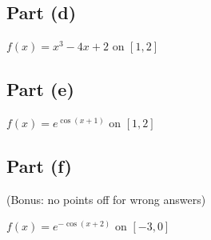 \subsection{Part (d)}

\begin{question}
\begin{center}
    $f(x) = x^3 −4x + 2$ on $[1,2]$
\end{center}
\end{question}

\begin{answer}

\end{answer}

\subsection{Part (e)}

\begin{question}
\begin{center}
    $f(x) = e^{\cos{(x+1)}}$ on $[1,2]$
\end{center}
\end{question}

\begin{answer}

\end{answer}

\subsection{Part (f)}

\begin{question}
(Bonus: no points off for wrong answers)
\begin{center}
    $f(x) = e^{−\cos{(x+2)}}$ on $[−3,0]$
\end{center}
\end{question}

\begin{answer}

\end{answer}